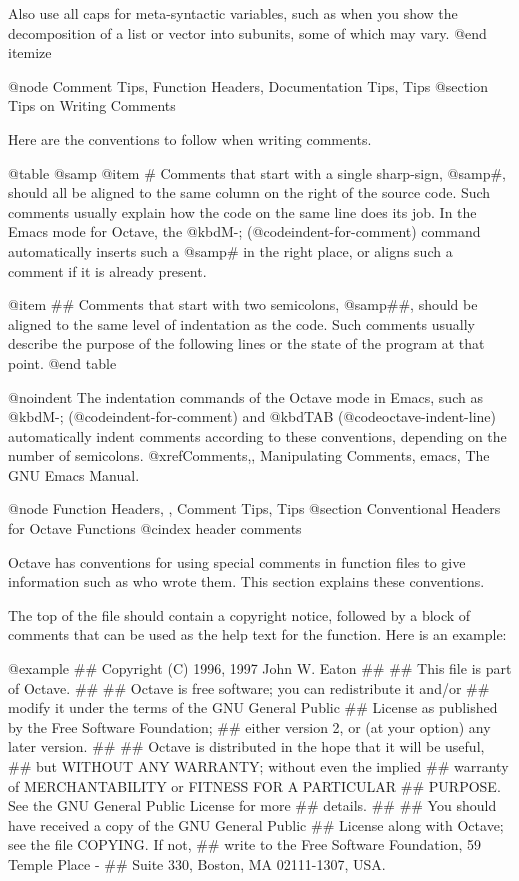 Also use all caps for meta-syntactic variables, such as when you show
the decomposition of a list or vector into subunits, some of which may
vary.
@end itemize

@node Comment Tips, Function Headers, Documentation Tips, Tips
@section Tips on Writing Comments

Here are the conventions to follow when writing comments.

@table @samp
@item #
Comments that start with a single sharp-sign, @samp{#}, should all be
aligned to the same column on the right of the source code.  Such
comments usually explain how the code on the same line does its job.  In
the Emacs mode for Octave, the @kbd{M-;} (@code{indent-for-comment})
command automatically inserts such a @samp{#} in the right place, or
aligns such a comment if it is already present.

@item ##
Comments that start with two semicolons, @samp{##}, should be aligned to
the same level of indentation as the code.  Such comments usually
describe the purpose of the following lines or the state of the program
at that point.
@end table

@noindent
The indentation commands of the Octave mode in Emacs, such as @kbd{M-;}
(@code{indent-for-comment}) and @kbd{TAB} (@code{octave-indent-line})
automatically indent comments according to these conventions,
depending on the number of semicolons.  @xref{Comments,,
Manipulating Comments, emacs, The GNU Emacs Manual}.

@node Function Headers,  , Comment Tips, Tips
@section Conventional Headers for Octave Functions
@cindex header comments

Octave has conventions for using special comments in function files
to give information such as who wrote them.  This section explains these
conventions.

The top of the file should contain a copyright notice, followed by a
block of comments that can be used as the help text for the function.
Here is an example:

@example
## Copyright (C) 1996, 1997 John W. Eaton
##
## This file is part of Octave.
##
## Octave is free software; you can redistribute it and/or
## modify it under the terms of the GNU General Public
## License as published by the Free Software Foundation;
## either version 2, or (at your option) any later version.
##
## Octave is distributed in the hope that it will be useful,
## but WITHOUT ANY WARRANTY; without even the implied
## warranty of MERCHANTABILITY or FITNESS FOR A PARTICULAR
## PURPOSE.  See the GNU General Public License for more
## details.
##
## You should have received a copy of the GNU General Public
## License along with Octave; see the file COPYING.  If not,
## write to the Free Software Foundation, 59 Temple Place -
## Suite 330, Boston, MA 02111-1307, USA.

